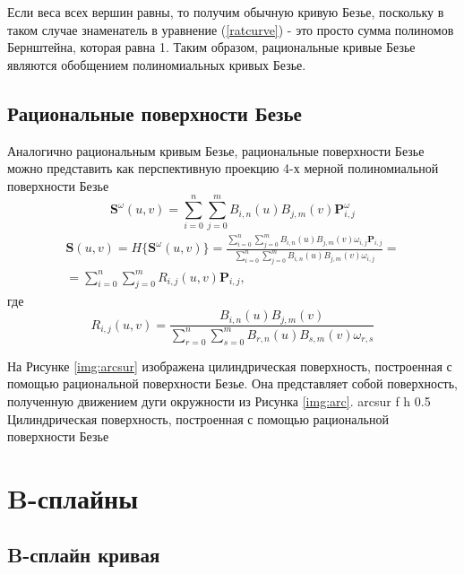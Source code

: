 \documentclass{bmstu}
\begin{document}
Если веса всех вершин равны, то получим обычную кривую Безье, поскольку в таком случае знаменатель в уравнение (\ref{ratcurve}) - это просто сумма полиномов Бернштейна, которая равна 1. Таким образом, рациональные кривые Безье являются обобщением полиномиальных кривых Безье.
\subsection{Рациональные поверхности Безье}

Аналогично рациональным кривым Безье, рациональные поверхности Безье можно представить как перспективную проекцию 4-х мерной полиномиальной поверхности Безье
\[
    \mathbf{S}^\omega(u, v) = \sum\limits_{i=0}^n\sum\limits_{j=0}^mB_{i,n}(u)B_{j,m}(v)\mathbf{P}^\omega_{i,j}
\]
\begin{multline}
    \mathbf{S}(u,v) = H\{\mathbf{S}^\omega(u, v)\} =  \frac{\sum\limits_{i=0}^n\sum\limits_{j=0}^mB_{i,n}(u)B_{j,m}(v)\omega_{i, j}\mathbf{P}_{i,j}}{\sum\limits_{i=0}^n\sum\limits_{j=0}^mB_{i,n}(u)B_{j,m}(v)\omega_{i, j}} =\\= \sum\limits_{i=0}^n\sum\limits_{j=0}^mR_{i,j}(u,v)\mathbf{P}_{i,j},
\end{multline}
где
\begin{equation}
    R_{i,j}(u, v) = \frac{B_{i, n}(u)B_{j, m}(v)}{\sum\limits_{r=0}^n\sum\limits_{s=0}^mB_{r,n}(u)B_{s,m}(v)\omega_{r, s}}
\end{equation}

На Рисунке \ref{img:arcsur} изображена цилиндрическая поверхность, построенная с помощью рациональной поверхности Безье. Она представляет собой поверхность, полученную движением дуги окружности из Рисунка \ref{img:arc}.
{arcsur} %
{f} %
{h} %
{0.5\textwidth} %
{Цилиндрическая поверхность, построенная с помощью рациональной поверхности Безье} %

\section{B-сплайны}

\subsection{B-сплайн кривая}
\end{document}
